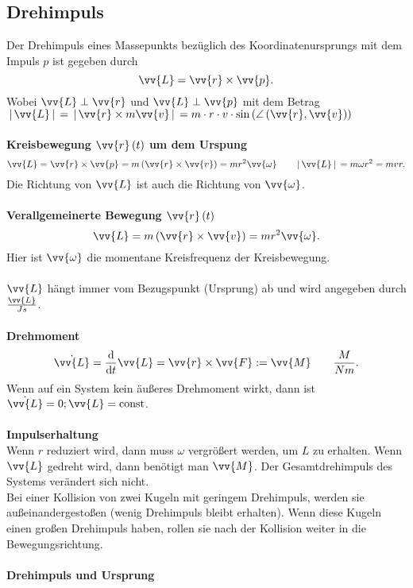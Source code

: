 \documentclass[a4paper,12pt]{article}
\begin{document}
\subsection{Drehimpuls}
Der Drehimpuls eines Massepunkts bezüglich des Koordinatenursprungs mit dem Impuls $p$ ist gegeben durch
\[ 
        \vv{L}=\vv{r}\times\vv{p} 
.\] 
Wobei $\vv{L}\perp\vv{r}$ und $\vv{L}\perp\vv{p}$ mit dem Betrag $\,|\, \vv{L}\,|\, =\,|\, \vv{r}\times m\vv{v}\,|\, =m\cdot r\cdot v\cdot \sin \left(\angle\left(\vv{r},\vv{v}\right)\right)$
\\\hfill\\\textbf{Kreisbewegung $\vv{r}\left(t\right)$ um dem Urspung}\\ 
\[ 
        \vv{L}=\vv{r}\times\vv{p}=m\left(\vv{r}\times\vv{v}\right)=mr^2\vv{\omega }\qquad \,|\, \vv{L}\,|\, =m\omega r^2=mvr
.\] 
Die Richtung von $\vv{L}$ ist auch die Richtung von $\vv{\omega }$.
\\\hfill\\\textbf{Verallgemeinerte Bewegung $\vv{r}\left(t\right)$}\\ 
\[ 
        \vv{L}=m\left(\vv{r}\times\vv{v}\right)=mr^2\vv{\omega }
.\] 
Hier ist $\vv{\omega }$ die momentane Kreisfrequenz der Kreisbewegung.\\\\
$\vv{L}$ hängt immer vom Bezugspunkt (Ursprung) ab und wird angegeben durch $\tfrac{\vv{L}}{Js}$.
\\\hfill\\\textbf{Drehmoment}\\ 
\[ 
        \dot{\vv{L}}=\dfrac{\text{d}}{\text{d}t}\vv{L}=\vv{r}\times\vv{F}:=\vv{M}\qquad \dfrac{M}{Nm}
.\] 
Wenn auf ein System kein äußeres Drehmoment wirkt, dann ist $\dot{\vv{L}}=0;\vv{L}=\text{const}$. 
\\\hfill\\\textbf{Impulserhaltung}\\ 
Wenn $r$ reduziert wird, dann muss $\omega $ vergrößert werden, um $L$ zu erhalten. Wenn $\vv{L}$ gedreht wird, dann benötigt man $\vv{M}$. Der Gesamtdrehimpuls des Systems verändert sich nicht.\\Bei einer Kollision von zwei Kugeln mit geringem Drehimpuls, werden sie außeinandergestoßen (wenig Drehimpuls bleibt erhalten). Wenn diese Kugeln einen großen Drehimpuls haben, rollen sie nach der Kollision weiter in die Bewegungsrichtung.
\\\hfill\\\textbf{Drehimpuls und Ursprung}\\ 
\end{document}
